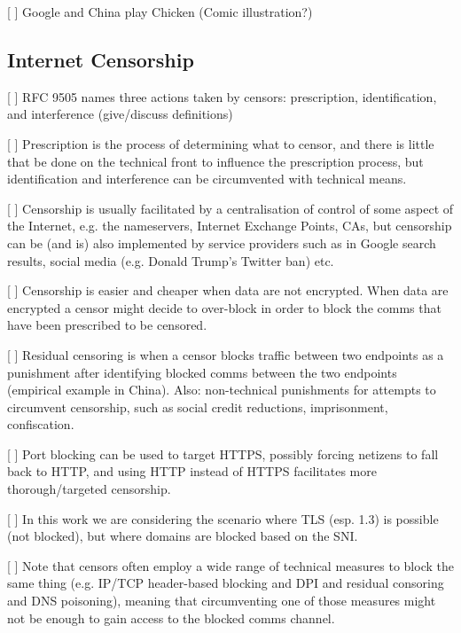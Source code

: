[ ] Google and China play Chicken (Comic illustration?)
\subsection{Internet Censorship}

[ ] RFC 9505 names three actions taken by censors: prescription, identification, and interference (give/discuss definitions)

[ ] Prescription is the process of determining what to censor, and there is little that be done on the technical front to influence the prescription process, but identification and interference can be circumvented with technical means.

[ ] Censorship is usually facilitated by a centralisation of control of some aspect of the Internet, e.g. the nameservers, Internet Exchange Points, CAs, but censorship can be (and is) also implemented by service providers such as in Google search results, social media (e.g. Donald Trump's Twitter ban) etc.

[ ] Censorship is easier and cheaper when data are not encrypted. When data are encrypted a censor might decide to over-block in order to block the comms that have been prescribed to be censored.

[ ] Residual censoring is when a censor blocks traffic between two endpoints as a punishment after identifying blocked comms between the two endpoints (empirical example in China). Also: non-technical punishments for attempts to circumvent censorship, such as social credit reductions, imprisonment, confiscation.

[ ] Port blocking can be used to target HTTPS, possibly forcing netizens to fall back to HTTP, and using HTTP instead of HTTPS facilitates more thorough/targeted censorship.

[ ] In this work we are considering the scenario where TLS (esp. 1.3) is possible (not blocked), but where domains are blocked based on the SNI.

[ ] Note that censors often employ a wide range of technical measures to block the same thing (e.g. IP/TCP header-based blocking and DPI and residual consoring and DNS poisoning), meaning that circumventing one of those measures might not be enough to gain access to the blocked comms channel.


